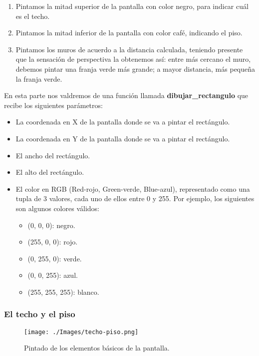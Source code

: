 \begin{enumerate}
\item Pintamos la mitad superior de la pantalla con color negro, para indicar cuál es el techo.
\item Pintamos la mitad inferior de la pantalla con color café, indicando el piso.
\item Pintamos los muros de acuerdo a la distancia calculada, teniendo presente que la sensación de perspectiva la obtenemos así: entre más cercano el muro, debemos pintar una franja verde más grande; a mayor distancia, más pequeña la franja verde.
\end{enumerate}

En esta parte nos valdremos de una función llamada \textbf{dibujar\_rectangulo} que recibe los siguientes parámetros:

\begin{itemize}
\item La coordenada en X de la pantalla donde se va a pintar el rectángulo.
\item La coordenada en Y de la pantalla donde se va a pintar el rectángulo.
\item El ancho del rectángulo.
\item El alto del rectángulo.
\item El color en RGB (Red-rojo, Green-verde, Blue-azul), representado como una tupla de 3 valores, cada uno de ellos entre 0 y 255. Por ejemplo, los siguientes son algunos colores válidos:
	\begin{itemize}
	\item (0, 0, 0): negro.
	\item (255, 0, 0): rojo.
	\item (0, 255, 0): verde.
	\item (0, 0, 255): azul.
	\item (255, 255, 255): blanco.
	\end{itemize}
\end{itemize}

\subsubsection{El techo y el piso}

\begin{figure}[h!]
	\centering
	\texttt{[image: ./Images/techo-piso.png]}
	\caption{Pintado de los elementos básicos de la pantalla.}
	\label{techo-piso}
\end{figure}

